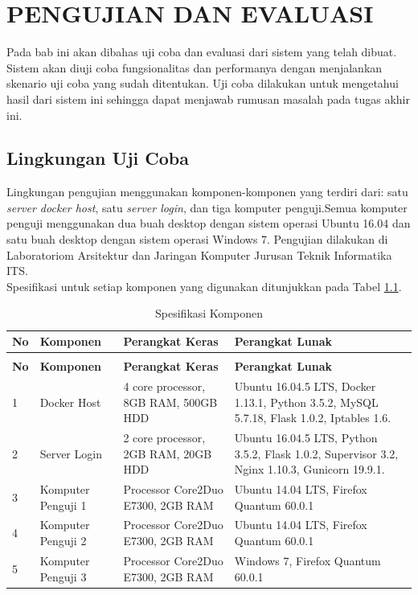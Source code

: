 \chapter{PENGUJIAN DAN EVALUASI}
	Pada bab ini akan dibahas uji coba dan evaluasi dari sistem yang telah dibuat. Sistem akan diuji coba fungsionalitas dan performanya dengan menjalankan skenario uji coba yang sudah ditentukan. Uji coba dilakukan untuk mengetahui hasil dari sistem ini sehingga dapat menjawab rumusan masalah pada tugas akhir ini.    
	
\section{Lingkungan Uji Coba}
	Lingkungan pengujian menggunakan komponen-komponen yang terdiri dari: satu \textit{server docker host}, satu \textit{server login}, dan tiga komputer penguji.Semua komputer penguji menggunakan dua buah desktop dengan sistem operasi Ubuntu 16.04 dan satu buah desktop dengan sistem operasi Windows 7. Pengujian dilakukan di Laboratoriom Arsitektur dan Jaringan Komputer Jurusan Teknik Informatika ITS. \\
    \indent Spesifikasi untuk setiap komponen yang digunakan ditunjukkan pada Tabel \ref{spesifikasikomponen}.
    \begin{longtable}{|p{}|p{}|p{}|p{}|}					\caption{Spesifikasi Komponen} \label{spesifikasikomponen} \\
        \hline
        \textbf{No} & \textbf{Komponen} & \textbf{Perangkat Keras} & \textbf{Perangkat Lunak} \\ \hline
        \endfirsthead
        \caption[]{Spesifikasi Komponen} \\
        \hline
        \textbf{No} & \textbf{Komponen} & \textbf{Perangkat Keras} & \textbf{Perangkat Lunak} \\ \hline
        \endhead
        \endfoot
        \endlastfoot

    	1 & Docker Host & 4 core processor, 8GB RAM, 500GB HDD & Ubuntu 16.04.5 LTS, Docker 1.13.1, Python 3.5.2, MySQL 5.7.18, Flask 1.0.2, Iptables 1.6. \\ \hline
        2 & Server Login & 2 core processor, 2GB RAM, 20GB HDD & Ubuntu 16.04.5 LTS,  Python 3.5.2, Flask 1.0.2, Supervisor 3.2, Nginx 1.10.3, Gunicorn 19.9.1. \\ \hline
        3 & Komputer Penguji 1 & Processor Core2Duo E7300, 2GB RAM & Ubuntu 14.04 LTS, Firefox Quantum 60.0.1 \\ \hline
        4 & Komputer Penguji 2 & Processor Core2Duo E7300, 2GB RAM & Ubuntu 14.04 LTS, Firefox Quantum 60.0.1 \\ \hline
        5 & Komputer Penguji 3 & Processor Core2Duo E7300, 2GB RAM & Windows 7, Firefox Quantum 60.0.1 \\ \hline
    \end{longtable}
    
